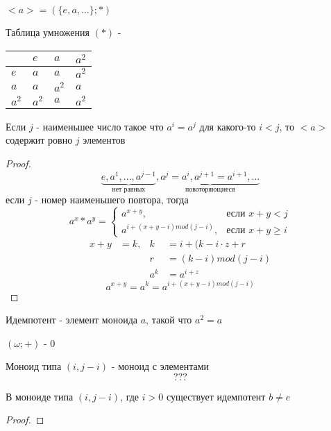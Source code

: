 \documentclass[../main/document.tex]{subfiles}
\begin{document}
\begin{exm} \label{cyclical-exm}
$<a>=(\{e,a,...\};*)$

Таблица умножения $(*)$ -
\begin{table}[h]
\centering
\renewcommand*{\arraystretch}{1.4}
\begin{tabular}{|l|l|l|l|}
\hline
  & $e$ & $a$ & $a^2$ \\ \hline
$e$ & $a$ & $a$ & $a^2$ \\ \hline
$a$ & $a$ & $a^2$ & $a$ \\ \hline
$a^2$ & $a^2$ & $a$ & $a^2$ \\
\hline
\end{tabular}
\end{table}
\end{exm}
\begin{thm}
Если $j$ - наименьшее число такое что $a^i=a^j$ для какого-то $i<j$, то $<a>$ содержит ровно $j$ элементов
\begin{proof}
$$\underbrace{e,a^1,...,a^{j-1}}_\text{нет равных},\underbrace{a^j=a^i,a^{j+1}=a^{i+1},...}_\text{повоторяющиеся}$$
если $j$ - номер наименьшего повтора, тогда
$$a^x*a^y=
\begin{cases}
	a^{x+y},& \text{если } x+y<j\\
	a^{i+(x+y-i)mod(j-i)},& \text{если } x+y\geq i
\end{cases}
$$
\begin{align*}
x+y&=k, & k&=i+(k-i\cdot z+r\\
& & r&=(k-i)mod(j-i)\\
& & a^k&=a^{i+z}
\end{align*}
$$a^{x+y}=a^k=a^{i+(x+y-i)mod(j-i)}$$

\end{proof}
\end{thm}

\begin{dfn}[Идемпотент]
Идемпотент - элемент моноида $a$, такой что $a^2=a$
\end{dfn}

\begin{exm}
$(\omega;+)$ - $0$
\end{exm}

\begin{dfn}
Моноид типа $(i,j-i)$ - моноид с элементами $$???$$
\end{dfn}

\begin{thm}
В моноиде типа $(i,j-i)$, где $i>0$ существует идемпотент $b\neq e$
\begin{proof}

\end{proof}
\end{thm}
\end{document}
